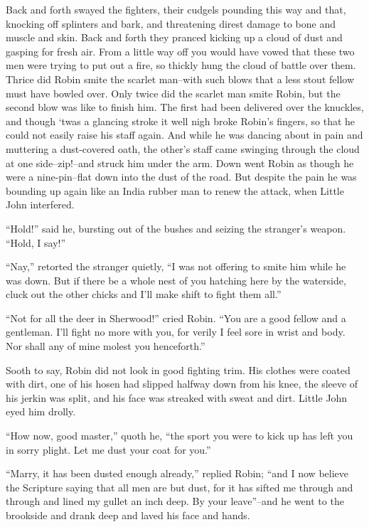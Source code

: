 Back and forth swayed the fighters, their cudgels pounding this way and
that, knocking off splinters and bark, and threatening direst damage to
bone and muscle and skin. Back and forth they pranced kicking up a cloud
of dust and gasping for fresh air. From a little way off you would have
vowed that these two men were trying to put out a fire, so thickly hung
the cloud of battle over them. Thrice did Robin smite the scarlet
man--with such blows that a less stout fellow must have bowled over.
Only twice did the scarlet man smite Robin, but the second blow was like
to finish him. The first had been delivered over the knuckles, and
though `twas a glancing stroke it well nigh broke Robin's fingers, so
that he could not easily raise his staff again. And while he was dancing
about in pain and muttering a dust-covered oath, the other's staff came
swinging through the cloud at one side--zip!--and struck him under the
arm. Down went Robin as though he were a nine-pin--flat down into the
dust of the road. But despite the pain he was bounding up again like an
India rubber man to renew the attack, when Little John interfered.

``Hold!'' said he, bursting out of the bushes and seizing the stranger's
weapon. ``Hold, I say!''

``Nay,'' retorted the stranger quietly, ``I was not offering to smite
him while he was down. But if there be a whole nest of you hatching here
by the waterside, cluck out the other chicks and I'll make shift to
fight them all.''

``Not for all the deer in Sherwood!'' cried Robin. ``You are a good
fellow and a gentleman. I'll fight no more with you, for verily I feel
sore in wrist and body. Nor shall any of mine molest you henceforth.''

Sooth to say, Robin did not look in good fighting trim. His clothes were
coated with dirt, one of his hosen had slipped halfway down from his
knee, the sleeve of his jerkin was split, and his face was streaked with
sweat and dirt. Little John eyed him drolly.

``How now, good master,'' quoth he, ``the sport you were to kick up has
left you in sorry plight. Let me dust your coat for you.''

``Marry, it has been dusted enough already,'' replied Robin; ``and I now
believe the Scripture saying that all men are but dust, for it has
sifted me through and through and lined my gullet an inch deep. By your
leave''--and he went to the brookside and drank deep and laved his face
and hands.

